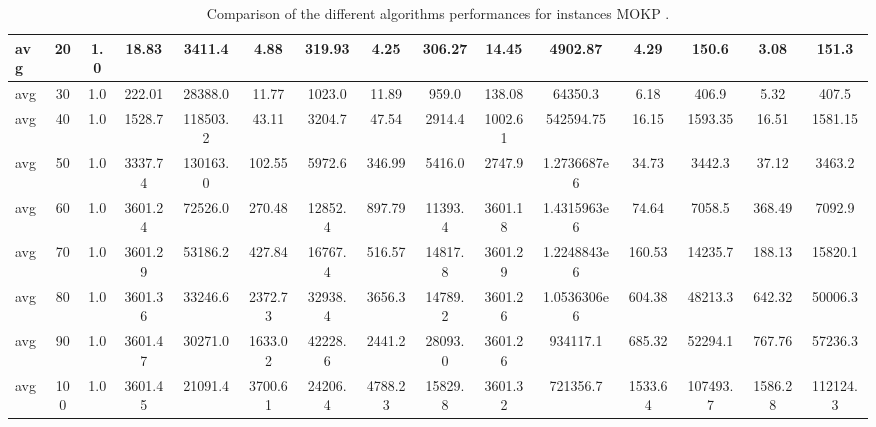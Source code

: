 \begin{table}[!ht]
{\begin{tabular}{lcccccccccccccc}
\hline avg & 20 & 1.0 &  18.83 & 3411.4 &  4.88 & 319.93 &  4.25 & 306.27 &  14.45 & 4902.87 &  4.29 & 150.6 &  3.08 & 151.3 \\ \hline
\hline avg & 30 & 1.0 &  222.01 & 28388.0 &  11.77 & 1023.0 &  11.89 & 959.0 &  138.08 & 64350.3 &  6.18 & 406.9 &  5.32 & 407.5 \\ \hline
\hline avg & 40 & 1.0 &  1528.7 & 118503.2 &  43.11 & 3204.7 &  47.54 & 2914.4 &  1002.61 & 542594.75 &  16.15 & 1593.35 &  16.51 & 1581.15 \\ \hline
\hline avg & 50 & 1.0 &  3337.74 & 130163.0 &  102.55 & 5972.6 &  346.99 & 5416.0 &  2747.9 & 1.2736687e6 &  34.73 & 3442.3 &  37.12 & 3463.2 \\ \hline
\hline avg & 60 & 1.0 &  3601.24 & 72526.0 &  270.48 & 12852.4 &  897.79 & 11393.4 &  3601.18 & 1.4315963e6 &  74.64 & 7058.5 &  368.49 & 7092.9 \\ \hline
\hline avg & 70 & 1.0 &  3601.29 & 53186.2 &  427.84 & 16767.4 &  516.57 & 14817.8 &  3601.29 & 1.2248843e6 &  160.53 & 14235.7 &  188.13 & 15820.1 \\ \hline
\hline avg & 80 & 1.0 &  3601.36 & 33246.6 &  2372.73 & 32938.4 &  3656.3 & 14789.2 &  3601.26 & 1.0536306e6 &  604.38 & 48213.3 &  642.32 & 50006.3 \\ \hline
\hline avg & 90 & 1.0 &  3601.47 & 30271.0 &  1633.02 & 42228.6 &  2441.2 & 28093.0 &  3601.26 & 934117.1 &  685.32 & 52294.1 &  767.76 & 57236.3 \\ \hline
\hline avg & 100 & 1.0 &  3601.45 & 21091.4 &  3700.61 & 24206.4 &  4788.23 & 15829.8 &  3601.32 & 721356.7 &  1533.64 & 107493.7 &  1586.28 & 112124.3 \\ \hline
\bottomrule
\end{tabular}
}%
\caption{Comparison of the different algorithms performances for instances MOKP .}
\end{table}
